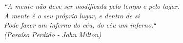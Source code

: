 \begin{epigrafe}
    \vspace*{\fill}
	\begin{flushright}
		\textit{``A mente não deve ser modificada pelo tempo e pelo lugar.\\
                          A mente é o seu próprio lugar, e dentro de si \\ 
                          Pode fazer um inferno do céu, do céu um inferno.`` \\ 
                          (Paraíso Perdido - John Milton)}
	\end{flushright}
\end{epigrafe}
